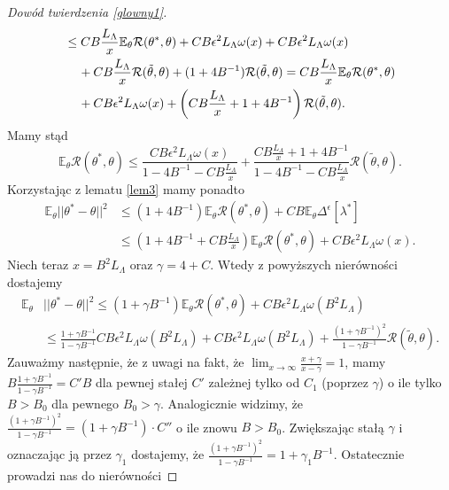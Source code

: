 \documentclass[man,mfiu]{mgrwms}
\begin{document}
\begin{proof}[Dowód twierdzenia \ref{glowny1}]
\begin{displaymath}
\begin{split}
&\leq CB\frac{L_{\Lambda}}{x}\mathbb{E}_{\theta}\mathcal{R}(\theta^*,\theta)+CB\epsilon^2L_{\Lambda}\omega (x)
+CB\epsilon^2L_{\Lambda}\omega (x)\\
&\hspace{4mm}+CB\frac{L_{\Lambda}}{x}\mathcal{R}(\tilde{\theta},\theta)+(1+4B^{-1})\mathcal{R}(\tilde{\theta},\theta)
=CB\frac{L_{\Lambda}}{x}\mathbb{E}_{\theta}\mathcal{R}(\theta^*,\theta)\\
&\hspace{4mm}+CB\epsilon^2L_{\Lambda}\omega (x)+\left(CB\frac{L_{\Lambda}}{x}+1+4B^{-1}\right)\mathcal{R}(\tilde{\theta},\theta).
\end{split}
\end{displaymath}
Mamy stąd
\begin{displaymath}
\mathbb{E}_{\theta}\mathcal{R}(\theta^*,\theta)\leq \frac{CB\epsilon^2L_{\Lambda}\omega (x)}{1-4B^{-1}-CB\frac{L_{\Lambda}}{x}}+\frac{CB\frac{L_{\Lambda}}{x}+1+4B^{-1}}{1-4B^{-1}-CB\frac{L_{\Lambda}}{x}}\mathcal{R}(\tilde{\theta},\theta).
\end{displaymath}
Korzystając z lematu \ref{lem3} mamy ponadto
\begin{displaymath}
\begin{split}
\mathbb{E}_{\theta}||\theta^*-\theta||^2&\leq (1+4B^{-1})\mathbb{E}_{\theta}\mathcal{R}(\theta^*,\theta)+CB\mathbb{E}_{\theta}\Delta^{\epsilon}[\lambda^*]\\
&\leq (1+4B^{-1}+CB\frac{L_{\Lambda}}{x})\mathbb{E}_{\theta}\mathcal{R}(\theta^*,\theta)+CB\epsilon^2L_{\Lambda}\omega (x).
\end{split}
\end{displaymath}
Niech teraz $x=B^2L_{\Lambda}$ oraz $\gamma=4+C$. Wtedy z powyższych nierówności dostajemy 
\begin{displaymath}
\begin{split}
\mathbb{E}_{\theta}&||\theta^*-\theta||^2\leq (1+\gamma B^{-1})\mathbb{E}_{\theta}\mathcal{R}(\theta^*,\theta)+CB\epsilon^2L_{\Lambda}\omega (B^2L_{\Lambda})\\
&\leq \frac{1+\gamma B^{-1}}{1-\gamma B^{-1}}CB\epsilon^2L_{\Lambda}\omega (B^2L_{\Lambda})+CB\epsilon^2L_{\Lambda}\omega (B^2L_{\Lambda})+\frac{(1+\gamma B^{-1})^2}{1-\gamma B^{-1}}\mathcal{R}(\tilde{\theta},\theta).
\end{split}
\end{displaymath}
Zauważmy następnie, że z uwagi na fakt, że $\lim_{x\to \infty}\frac{x+\gamma}{x-\gamma}=1$, mamy 
$B\frac{1+\gamma B^{-1}}{1-\gamma B^{-1}}=C'B$ dla pewnej stałej $C'$ zależnej tylko od $C_1$ (poprzez $\gamma$) o ile tylko $B>B_0$ dla pewnego $B_0>\gamma$. Analogicznie widzimy, że  $\frac{(1+\gamma B^{-1})^2}{1-\gamma B^{-1}}=(1+\gamma B^{-1})\cdot C''$ o ile znowu $B>B_0$. Zwiększając stałą $\gamma$ i oznaczając ją przez $\gamma_1$ dostajemy, że $\frac{(1+\gamma B^{-1})^2}{1-\gamma B^{-1}}=1+\gamma_1B^{-1}$. Ostatecznie prowadzi nas do nierówności 

\end{proof}
\end{document}
